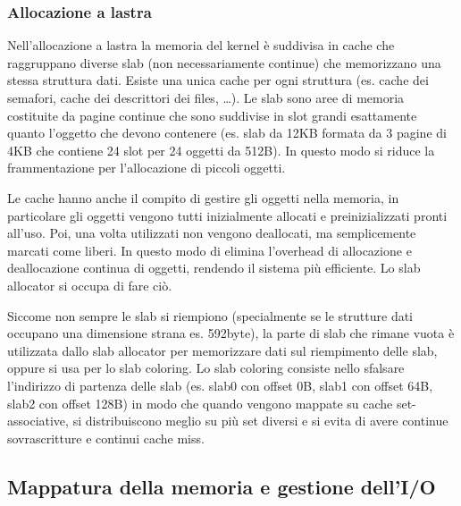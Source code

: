 \documentclass[a4paper]{article}
\begin{document}
\subsubsection*{Allocazione a lastra}
Nell'allocazione a lastra la memoria del kernel è suddivisa in cache che raggruppano diverse slab (non necessariamente continue)
che memorizzano una stessa struttura dati. Esiste una unica cache per ogni struttura (es. cache dei semafori, cache dei descrittori
dei files, \dots). Le slab sono aree di memoria costituite da pagine continue che sono suddivise in slot grandi esattamente quanto 
l'oggetto che devono contenere (es. slab da 12KB formata da 3 pagine di 4KB che contiene 24 slot per 24 oggetti da 512B). In questo
modo si riduce la frammentazione per l'allocazione di piccoli oggetti.

Le cache hanno anche il compito di gestire gli oggetti nella memoria, in particolare gli oggetti vengono tutti inizialmente
allocati e preinizializzati pronti all'uso. Poi, una volta utilizzati non vengono deallocati, ma semplicemente marcati come
liberi. In questo modo di elimina l'overhead di allocazione e deallocazione continua di oggetti, rendendo il sistema più
efficiente. Lo slab allocator si occupa di fare ciò.

Siccome non sempre le slab si riempiono (specialmente se le strutture dati occupano una dimensione strana es. 592byte), la parte
di slab che rimane vuota è utilizzata dallo slab allocator per memorizzare dati sul riempimento delle slab, oppure si usa per
lo slab coloring. Lo slab coloring consiste nello sfalsare l'indirizzo di partenza delle slab (es. slab0 con offset 0B, slab1
con offset 64B, slab2 con offset 128B) in modo che quando vengono mappate su cache set-associative, si distribuiscono meglio
su più set diversi e si evita di avere continue sovrascritture e continui cache miss.


\subsection{Mappatura della memoria e gestione dell'I/O}
\end{document}
